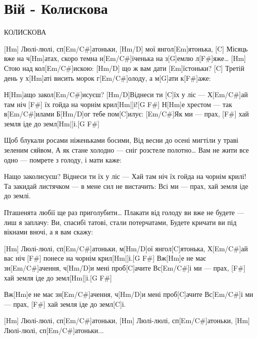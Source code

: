 \section{Вій - Колискова}
\begin{guitar}
КОЛИСКОВА

[Hm] Люлі-люлі, сп[Em/C#]атоньки, [Hm/D] мої янгол[Em]ятонька,
[C] Місяць вже на ч[Hm]атах, скоро темна н[Em/C#]іченька на з[G]емлю л[F#]яже…
[Hm] Стою над кол[Em/C#]искою: [Hm/D] що ж вам дати [Em]їстоньки?
[C] Третій день у х[Hm]аті висить морок г[Em/C#]олоду, а м[G]ати к[F#]аже:

Н[Hm]ащо закол[Em/C#]исуєш? [Hm/D]Віднеси ти [C]їх у ліс --- 
Х[Em/C#]ай там ніч [F#] їх гойда на чорнім крил[Hm|]і![G  F#]\newline
Н[Hm]е хрестом --- так в[Em/C#]илами Б[Hm/D]ог тебе пом[C]илує:
[Em/C#]Як ми --- прах, [F#] хай земля іде до земл[Hm|]і.[G F#]\newline

Щоб блукали росами ніженьками босими,
Від весни до осені мигтіли у траві зеленим сяйвом,
А як стане холодно --- сніг розстеле полотно…
Вам не жити все одно --- помрете з голоду, і мати каже:

Нащо заколисуєш? Віднеси ти їх у ліс --- 
Хай там ніч їх гойда на чорнім крилі!
Та закидай листячком --- в мене сил не вистачить:
Всі ми --- прах, хай земля іде до землі.

Пташенята любії ще раз приголубити…
Плакати від голоду ви вже не будете --- лиш я заплачу:
Ви, спасибі татові, стали потерчатами,
Будете кричати ви під вікнами вночі, а я вам скажу:

[Hm] Люлі-люлі, сп[Em/C#]атоньки, м[Hm/D]ої янгол[C]ятонька,
Х[Em/C#]ай вас ніч [F#] понесе на чорнім крил[Hm|]і.[G F#] \newline
Вж[Hm]е не має зн[Em/C#]ачення, ч[Hm/D]и мені проб[C]ачите
Вс[Em/C#]і ми --- прах, [F#] хай земля іде до земл[Hm|]і.[G F#] \newline

Вж[Hm]е не має зн[Em/C#]ачення, ч[Hm/D]и мені проб[C]ачите
Вс[Em/C#]і ми --- прах, [F#] хай земля іде до земл[C]і.

[Hm] Люлі-люлі, сп[Em/C#]атоньки,
[Hm] Люлі-люлі, сп[Em/C#]атоньки,
[Hm] Люлі-люлі, сп[Em/C#]атоньки...
\end{guitar}